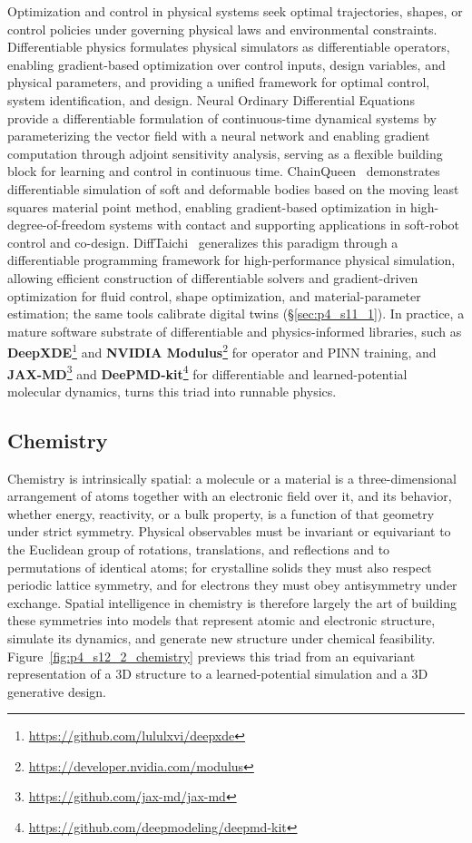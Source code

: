 Optimization and control in physical systems seek optimal trajectories, shapes, or control policies under governing physical laws and environmental constraints.
Differentiable physics formulates physical simulators as differentiable operators, enabling gradient-based optimization over control inputs, design variables, and physical parameters, and providing a unified framework for optimal control, system identification, and design.
Neural Ordinary Differential Equations~\cite{chen2018neural} provide a differentiable formulation of continuous-time dynamical systems by parameterizing the vector field with a neural network and enabling gradient computation through adjoint sensitivity analysis, serving as a flexible building block for learning and control in continuous time.
ChainQueen~\cite{hu2019chainqueen} demonstrates differentiable simulation of soft and deformable bodies based on the moving least squares material point method, enabling gradient-based optimization in high-degree-of-freedom systems with contact and supporting applications in soft-robot control and co-design.
DiffTaichi~\cite{hu2020difftaichi} generalizes this paradigm through a differentiable programming framework for high-performance physical simulation, allowing efficient construction of differentiable solvers and gradient-driven optimization for fluid control, shape optimization, and material-parameter estimation; the same tools calibrate digital twins (§\ref{sec:p4_s11_1}).
In practice, a mature software substrate of differentiable and physics-informed libraries, such as \textbf{DeepXDE}\footnote{\url{https://github.com/lululxvi/deepxde}} and \textbf{NVIDIA Modulus}\footnote{\url{https://developer.nvidia.com/modulus}} for operator and PINN training, and \textbf{JAX-MD}\footnote{\url{https://github.com/jax-md/jax-md}} and \textbf{DeePMD-kit}\footnote{\url{https://github.com/deepmodeling/deepmd-kit}} for differentiable and learned-potential molecular dynamics, turns this triad into runnable physics.




\subsection{Chemistry}
\label{subsec:p4-sec12-2-chemistry}

Chemistry is intrinsically spatial: a molecule or a material is a three-dimensional arrangement of atoms together with an electronic field over it, and its behavior, whether energy, reactivity, or a bulk property, is a function of that geometry under strict symmetry.
Physical observables must be invariant or equivariant to the Euclidean group of rotations, translations, and reflections and to permutations of identical atoms; for crystalline solids they must also respect periodic lattice symmetry, and for electrons they must obey antisymmetry under exchange.
Spatial intelligence in chemistry is therefore largely the art of building these symmetries into models that represent atomic and electronic structure, simulate its dynamics, and generate new structure under chemical feasibility.
Figure~\ref{fig:p4_s12_2_chemistry} previews this triad from an equivariant representation of a 3D structure to a learned-potential simulation and a 3D generative design.

